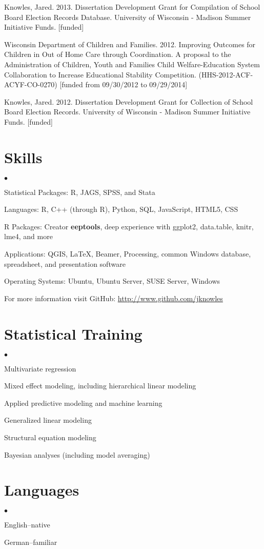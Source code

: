 \documentclass[margin,line]{res}
\newenvironment{list2}{
  \begin{list}{$\bullet$}{%
      \setlength{\itemsep}{0in}
      \setlength{\parsep}{0in} \setlength{\parskip}{0in}
      \setlength{\topsep}{0in} \setlength{\partopsep}{0in} 
      \setlength{\leftmargin}{0.2in}}}{\end{list}}
\begin{document}
\begin{resume}
Knowles, Jared. 2013. Dissertation Development Grant for Compilation of School Board Election Records Database. University of Wisconsin - Madison Summer Initiative Funds. [funded]

Wisconsin Department of Children and Families. 2012. Improving Outcomes for Children in Out of Home Care through Coordination. A proposal to the Administration of Children, Youth and Families 
 Child Welfare-Education System Collaboration to Increase Educational Stability Competition. (HHS-2012-ACF-ACYF-CO-0270) [funded from 09/30/2012 to 09/29/2014]

Knowles, Jared. 2012. Dissertation Development Grant for Collection of School Board Election Records. University of Wisconsin - Madison Summer Initiative Funds. [funded]

\section{\sc Skills} 
\begin{list2}
\item Statistical Packages:  R, JAGS, SPSS, and Stata
\item Languages:  R, C++ (through R), Python, SQL, JavaScript, HTML5, CSS
\item R Packages: Creator \textbf{eeptools}, deep experience with ggplot2, data.table, knitr, lme4, and more
\item Applications: QGIS, \LaTeX, Beamer, Processing, common Windows
  database, spreadsheet, and presentation software
\item Operating Systems:  Ubuntu, Ubuntu Server, SUSE Server, Windows
\item For more information visit GitHub: \url{http://www.github.com/jknowles}\\
\end{list2}

\section{\sc Statistical Training}
\begin{list2}
\item Multivariate regression
\item Mixed effect modeling, including hierarchical linear modeling
\item Applied predictive modeling and machine learning
\item Generalized linear modeling
\item Structural equation modeling
\item Bayesian analyses (including model averaging)
\end{list2}

\vspace{-2mm}
\section{\sc Languages}

\begin{list2}
\item English--native
\item German--familiar
\end{list2}


\end{resume}
\end{document}

